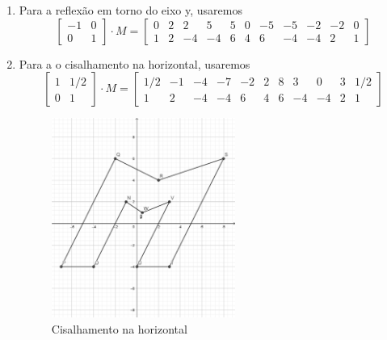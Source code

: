 \documentclass[english,ngerman,parskip=half]{scrartcl}
\begin{document}
\begin{enumerate}
\begin{enumerate}
        \item
            Para a reflexão em torno do eixo y, usaremos
            \begin{equation}
                \begin{bmatrix} 
                -1 & 0 \\
                 0 & 1
                \end{bmatrix} 
                \cdot M = 
                \begin{bmatrix} 
                0 & 2 & 2 & 5 & 5 & 0 & -5  & -5 & -2 & -2 & 0 \\
                1 & 2 & -4&-4 & 6 & 4 & 6   & -4 & -4 &  2 & 1
                \end{bmatrix} 
            \end{equation}
        \item
            Para a o cisalhamento na horizontal, usaremos
            \begin{equation}
                \begin{bmatrix} 
                1 & 1/2 \\
                 0 & 1
                \end{bmatrix} 
                \cdot M = 
                \begin{bmatrix} 
                1/2 & -1 & -4 & -7 & -2 & 2 & 8  & 3 & 0 & 3 & 1/2 \\
                1 & 2 & -4&-4 & 6 & 4 & 6   & -4 & -4 &  2 & 1
                \end{bmatrix} 
            \end{equation}
            \begin{figure}[ht!]
                \centering
                \includegraphics[width=60mm]{./images/ex3-cisalhamento.png}
                \caption{Cisalhamento na horizontal}
            \end{figure}


\end{enumerate}
\end{enumerate}
\end{document}
